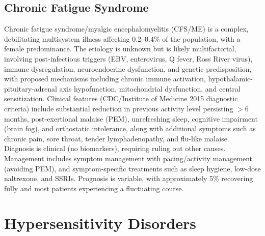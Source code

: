 



\label{sec:Chronic Fatigue Syndrome / Myalgic Encephalomyelitis}

\subsection{Chronic Fatigue Syndrome}
\label{sec:Chronic Fatigue Syndrome}
Chronic fatigue syndrome/myalgic encephalomyelitis (CFS/ME) is a complex, debilitating multisystem illness affecting 0.2--0.4\% of the population, with a female predominance. The etiology is unknown but is likely multifactorial, involving post-infectious triggers (EBV, enterovirus, Q fever, Ross River virus), immune dysregulation, neuroendocrine dysfunction, and genetic predisposition, with proposed mechanisms including chronic immune activation, hypothalamic-pituitary-adrenal axis hypofunction, mitochondrial dysfunction, and central sensitization. Clinical features (CDC/Institute of Medicine 2015 diagnostic criteria) include substantial reduction in previous activity level persisting $>$6 months, post-exertional malaise (PEM), unrefreshing sleep, cognitive impairment (brain fog), and orthostatic intolerance, along with additional symptoms such as chronic pain, sore throat, tender lymphadenopathy, and flu-like malaise. Diagnosis is clinical (no biomarkers), requiring ruling out other causes. Management includes symptom management with pacing/activity management (avoiding PEM), and symptom-specific treatments such as sleep hygiene, low-dose naltrexone, and SSRIs. Prognosis is variable, with approximately 5\% recovering fully and most patients experiencing a fluctuating course.

\section{Hypersensitivity Disorders}

